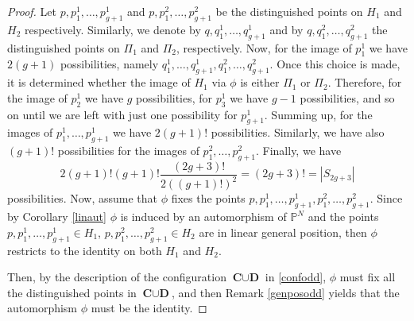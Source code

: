 \documentclass[a4paper,10pt]{amsart}
\theoremstyle{definition}
\begin{document}
\begin{proof}
Let $p,p_1^1,\dots,p_{g+1}^1$ and $p,p_1^2,\dots,p_{g+1}^2$ be the distinguished points on $H_1$ and $H_2$ respectively. Similarly, we denote by $q,q_1^1,\dots,q_{g+1}^1$ and by $q,q_1^2,\dots,q_{g+1}^2$ the distinguished points on $\Pi_1$ and $\Pi_2$, respectively. Now, for the image of $p_1^1$ we have $2(g+1)$ possibilities, namely $q_1^1,\dots,q_{g+1}^1,q_1^2,\dots,q_{g+1}^2$. Once this choice is made, it is determined whether the image of $H_1$ via $\phi$ is either $\Pi_1$ or $\Pi_2$. Therefore, for the image of $p_2^1$ we have $g$ possibilities, for $p_3^1$ we have $g-1$ possibilities, and so on until we are left with just one possibility for $p_{g+1}^1$. Summing up, for the images of $p_1^1,\dots,p_{g+1}^1$ we have $2(g+1)!$ possibilities. Similarly, we have also $(g+1)!$ possibilities for the images of $p_1^2,\dots,p_{g+1}^2$. Finally, we have 
$$2(g+1)!(g+1)!\frac{(2g+3)!}{2((g+1)!)^2} = (2g+3)! = |S_{2g+3}|$$ 
possibilities. Now, assume that $\phi$ fixes the points $p,p_1^1,\dots,p_{g+1}^1, p_1^2,\dots,p_{g+1}^2$. Since by Corollary \ref{linaut} $\phi$ is induced by an automorphism of $\mathbb{P}^N$ and the points $p,p_1^1,\dots,p_{g+1}^1\in H_1$, $p,p_1^2,\dots,p_{g+1}^2\in H_2$ are in linear general position, then $\phi$ restricts to the identity on both $H_1$ and $H_2$.

Then, by the description of the configuration $\textbf{C}\cup \textbf{D}$ in \ref{confodd}, $\phi$ must fix all the distinguished points in $\textbf{C}\cup \textbf{D}$, and then Remark \ref{genposodd} yields that the automorphism $\phi$ must be the identity.
\end{proof}



\end{document}
